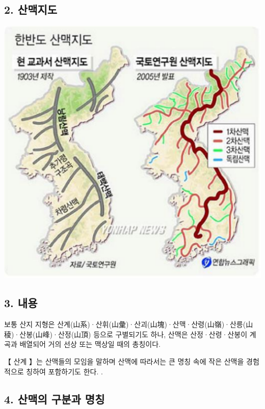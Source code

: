 \documentclass[12pt,a4paper]{book}
\begin{document}
		\newpage  \null
		\subsection{2. 산맥지도}
		\null

				\includegraphics[width=1.0\textwidth]{./fig/fig__122.pdf}


		\newpage  \null
		\subsection{3. 내용}
		\null




보통 산지 지형은 산계(山系)·산휘(山彙)·산괴(山塊)·산맥·산령(山嶺)·산릉(山稜)·산봉(山峰)·산정(山頂) 등으로 구별되기도 하나, 산맥은 산정·산령·산봉이 계곡과 배열되어 거의 선상 또는 맥상일 때의 총칭이다. 

【 산계 】는 산맥들의 모임을 말하며 산맥에 따라서는 큰 명칭 속에 작은 산맥을 경험적으로 칭하여 포함하기도 한다.
. 

		\newpage  \null
		\subsection{4. 산맥의 구분과 명칭}
		\null
\end{document}
